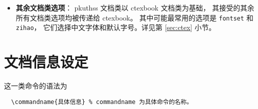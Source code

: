 \begin{itemize}
    \item \textbf{其余文档类选项}：%
        pkuthss 文档类以 ctexbook 文档类为基础，
        其接受的其余所有文档类选项均被传递给 ctexbook。
        其中可能最常用的选项是 \verb|fontset| 和 \verb|zihao|，
        它们选择中文字体和默认字号。详见第 \ref{sec:ctex} 小节。
\end{itemize}

\section{文档信息设定}
\label{sec:info}

这一类命令的语法为
\begin{Verbatim}
  \commandname{具体信息} % commandname 为具体命令的名称。
\end{Verbatim}

